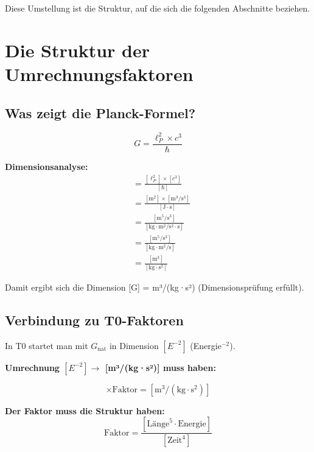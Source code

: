 	Diese Umstellung ist die Struktur, auf die sich die folgenden Abschnitte beziehen.
	
	\section{Die Struktur der Umrechnungsfaktoren}
	
	\subsection{Was zeigt die Planck-Formel?}
	
	\begin{formula}
		\begin{equation}
			\boxed{G = \frac{\ell_P^2 \times c^3}{\hbar}}
		\end{equation}
		
		\textbf{Dimensionsanalyse:}
		\begin{align}
			[G] &= \frac{[\ell_P^2] \times [c^3]}{[\hbar]} \\
			&= \frac{[\text{m}^2] \times [\text{m}^3/\text{s}^3]}{[\text{J} \cdot \text{s}]} \\
			&= \frac{[\text{m}^5/\text{s}^3]}{[\text{kg} \cdot \text{m}^2/\text{s}^2 \cdot \text{s}]} \\
			&= \frac{[\text{m}^5/\text{s}^3]}{[\text{kg} \cdot \text{m}^2/\text{s}]} \\
			&= \frac{[\text{m}^3]}{[\text{kg} \cdot \text{s}^2]}
		\end{align}
		
		Damit ergibt sich die Dimension [G] = m³/(kg·s²) (Dimensionsprüfung erfüllt).
	\end{formula}
	
	\subsection{Verbindung zu T0-Faktoren}
	
	In T0 startet man mit $G_{\text{nat}}$ in Dimension $[E^{-2}]$ (Energie$^{-2}$).
	
	\textbf{Umrechnung $[E^{-2}] \to$ [m³/(kg·s²)] muss haben:}
	
	\begin{equation}
		[E^{-2}] \times \text{Faktor} = [\text{m}^3/(\text{kg} \cdot \text{s}^2)]
	\end{equation}
	
	\textbf{Der Faktor muss die Struktur haben:}
	\begin{equation}
		\text{Faktor} = \frac{[\text{Länge}^5 \cdot \text{Energie}]}{[\text{Zeit}^4]}
	\end{equation}

